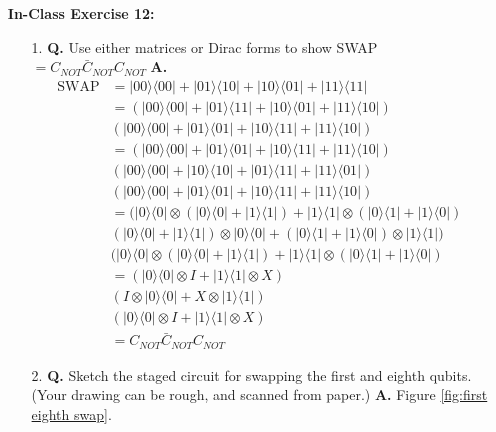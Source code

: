 \documentclass[main.tex]{subfiles}
\begin{document}
\begin{enumerate}
\item[] \textbf{In-Class Exercise 12:}
\begin{enumerate}
    \item [1.] \textbf{Q.} Use either matrices or Dirac forms to show SWAP $=C_{N O T} \bar{C}_{NOT} C_{NOT}$ \textbf{A.}
    \begin{align*}
        \text{SWAP} & = |00\rangle\langle00|+|01\rangle\langle10|+|10\rangle\langle01|+|11\rangle\langle 11|\\
                    & = (|00\rangle\langle00|+|01\rangle\langle11|+|10\rangle\langle01|+|11\rangle\langle10|)\\
                    & (|00\rangle\langle00|+|01\rangle\langle01|+|10\rangle\langle11|+|11\rangle\langle10|)\\
                    & = (|00\rangle\langle00|+|01\rangle\langle01|+|10\rangle\langle11|+|11\rangle\langle10|)\\
                    & (|00\rangle\langle00|+|10\rangle\langle10|+|01\rangle\langle11|+|11\rangle\langle01|) \\
                    &(|00\rangle\langle00|+|01\rangle\langle01|+|10\rangle\langle11|+|11\rangle\langle10|)\\
                    & = (|0\rangle\langle0| \otimes (|0\rangle\langle0|+|1\rangle\langle1|)
                    + |1\rangle\langle1| \otimes (|0\rangle\langle1|+|1\rangle\langle0|)\\
                    & (|0\rangle\langle0|+|1\rangle\langle1|) \otimes |0\rangle\langle0| + 
                    (|0\rangle\langle1|+|1\rangle\langle0|) \otimes |1\rangle \langle1|)\\
                    & (|0\rangle\langle0| \otimes (|0\rangle\langle0|+|1\rangle\langle1|)
                    + |1\rangle\langle1| \otimes(|0\rangle\langle1|+|1\rangle\langle0|)\\
                    & = (|0\rangle\langle0|\otimes I+|1\rangle\langle1|\otimes X)\\
                    & (I\otimes|0\rangle\langle0|+X\otimes|1\rangle\langle1|)\\
                    & (|0\rangle\langle0|\otimes I+|1\rangle\langle1|\otimes X)\\
                    & = C_{NOT} \bar{C}_{NOT} C_{NOT}
    \end{align*}
    \item [2.] \textbf{Q.} Sketch the staged circuit for swapping the first and eighth qubits. (Your drawing can be rough, and scanned from paper.) \textbf{A.} Figure \ref{fig:first eighth swap}.

\end{enumerate}
\end{enumerate}
\end{document}
